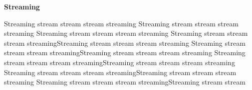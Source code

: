 \begin{center} \textbf{\huge Streaming} \end{center}
Streaming stream stream stream streaming Streaming stream stream stream streaming Streaming stream stream stream streaming Streaming stream stream stream streamingStreaming stream stream stream streaming Streaming stream stream stream streamingStreaming stream stream stream streaming Streaming stream stream stream streamingStreaming stream stream stream streaming Streaming stream stream stream streamingStreaming stream stream stream streaming Streaming stream stream stream streamingStreaming stream stream 
